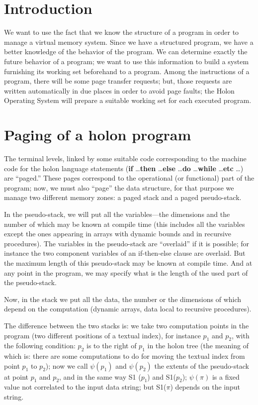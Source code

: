 \documentclass[openany,nobib]{tufte-book}
\newcommand{\kw}[1]{{\bf #1}}
\begin{document}
\section{Introduction}

We want to use the fact that we know the structure of a program in order to
manage a virtual memory system. Since we have a structured program, we have a
better knowledge of the behavior of the program. We can determine exactly the
future behavior of a program; we want to use this information to build a system
furnishing its working set beforehand to a program. Among the instructions of a
program, there will be some page transfer requests; but, those requests are
written automatically in due places in order to avoid page faults; the Holon
Operating System will prepare a suitable working set for each executed program.

\section{Paging of a holon program}

The terminal levels, linked by some suitable code corresponding to the machine
code for the holon language statements
(\kw{if} \dots\kw{then} \dots\kw{else} \dots\kw{do} \dots\kw{while}
\dots\kw{etc} \dots) are ``paged.'' These
pages correspond to the operational (or functional) part of the program; now,
we must also ``page'' the data structure, for that purpose we manage two
different memory zones: a paged stack and a paged pseudo-stack.

In the pseudo-stack, we will put all the variables---the dimensions and the
number of which may be known at compile time (this includes all the variables
except the ones appearing in arrays with dynamic bounds and in recursive
procedures). The variables in the pseudo-stack are ``overlaid'' if it is
possible; for instance the two component variables of an if-then-else clause
are overlaid. But the maximum length of this pseudo-stack may be known at
compile time. And at any point in the program, we may specify what is the
length of the used part of the pseudo-stack.

Now, in the stack we put all the data, the number or the dimensions of which
depend on the computation (dynamic arrays, data local to recursive procedures).

The difference between the two stacks is: we take two computation points in the
program (two different positions of a textual index), for instance $p_1$ and
$p_2$, with the following condition: $p_2$ is to the right of $p_1$ in the
holon tree (the meaning of which is: there are some computations to do for
moving the textual index from point $p_1$ to $p_2$); now we call $\psi(p_1)$
and $\psi(p_2)$ the extents of the pseudo-stack at point $p_1$ and $p_2$, and
in the same way S1 ($p_1$) and S1($p_2$); $\psi(\pi)$ is a fixed value not
correlated to the input data string; but S1($\pi$) depends on the input string.
\end{document}
